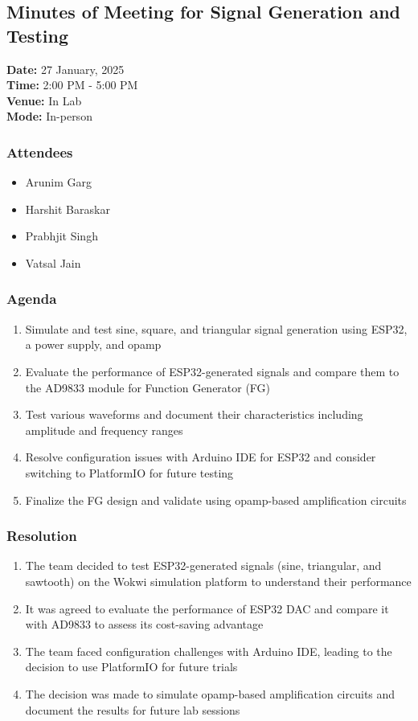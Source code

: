 \documentclass[12pt,a4paper]{article}
\begin{document}
\subsection*{Minutes of Meeting for Signal Generation and Testing}
\noindent
\textbf{Date:} 27 January, 2025 \\
\textbf{Time:} 2:00 PM - 5:00 PM \\
\textbf{Venue:} In Lab \\
\textbf{Mode:} In-person \\

\subsubsection*{Attendees}
\begin{itemize}
    \item Arunim Garg
    \item Harshit Baraskar
    \item Prabhjit Singh
    \item Vatsal Jain

\end{itemize}


\subsubsection*{Agenda}
\begin{enumerate}
    \item Simulate and test sine, square, and triangular signal generation using ESP32, a power supply, and opamp
    \item Evaluate the performance of ESP32-generated signals and compare them to the AD9833 module for Function Generator (FG)
    \item Test various waveforms and document their characteristics including amplitude and frequency ranges
    \item Resolve configuration issues with Arduino IDE for ESP32 and consider switching to PlatformIO for future testing
    \item Finalize the FG design and validate using opamp-based amplification circuits
\end{enumerate}

\subsubsection*{Resolution}
\begin{enumerate}
    \item The team decided to test ESP32-generated signals (sine, triangular, and sawtooth) on the Wokwi simulation platform to understand their performance
    \item It was agreed to evaluate the performance of ESP32 DAC and compare it with AD9833 to assess its cost-saving advantage
    \item The team faced configuration challenges with Arduino IDE, leading to the decision to use PlatformIO for future trials
    \item The decision was made to simulate opamp-based amplification circuits and document the results for future lab sessions
\end{enumerate}
\end{document}
